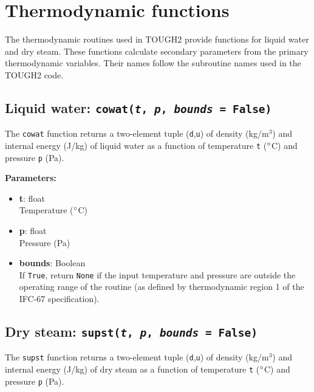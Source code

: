 \section{Thermodynamic functions}

The thermodynamic routines used in TOUGH2 provide functions for liquid water and dry steam.  These functions calculate secondary parameters from the primary thermodynamic variables.  Their names follow the subroutine names used in the TOUGH2 code.

\begin{snugshade}
\subsection{Liquid water: \texttt{cowat(\emph{t}, \emph{p}, \emph{bounds} = False)}}
\end{snugshade}
\label{sec:t2thermo:cowat}

The \texttt{cowat} function returns a two-element tuple (\texttt{d},\texttt{u}) of density (kg/m$^3$) and internal energy (J/kg) of liquid water as a function of temperature \texttt{t} ($\degree$C) and pressure \texttt{p} (Pa).

\textbf{Parameters:}
\begin{itemize}
\item \textbf{t}: float\\
  Temperature ($\degree$C)
\item \textbf{p}: float\\
  Pressure (Pa)
\item \textbf{bounds}: Boolean\\
  If \texttt{True}, return \texttt{None} if the input temperature and pressure are outside the operating range of the routine (as defined by thermodynamic region 1 of the IFC-67 specification).
\end{itemize}

\begin{snugshade}
\subsection{Dry steam: \texttt{supst(\emph{t}, \emph{p}, \emph{bounds} = False)}}
\end{snugshade}
\label{sec:t2thermo:supst}

The \texttt{supst} function returns a two-element tuple (\texttt{d},\texttt{u}) of density (kg/m$^3$) and internal energy (J/kg) of dry steam as a function of temperature \texttt{t} ($\degree$C) and pressure \texttt{p} (Pa).

